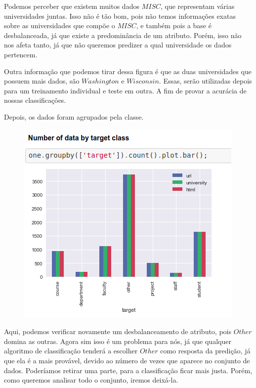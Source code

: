 \documentclass [12pt, a4paper] {article}
\begin{document}
Podemos perceber que existem muitos dados $MISC$, que representam várias universidades juntas. Isso não é tão bom, pois não temos informações exatas sobre as universidades que compõe o $MISC$, e também pois a base é desbalanceada, já que existe a predominância de um atributo. Porém, isso não nos afeta tanto, já que não queremos predizer a qual universidade os dados pertencem.

Outra informação que podemos tirar dessa figura é que as duas universidades que possuem mais dados, são $Washington$ e $Wisconsin$. Essas, serão utilizadas depois para um treinamento individual e teste em outra. A fim de provar a acurácia de nossas classificações.


Depois, os dados foram agrupados pela classe.

\begin{figure}[!hbt]
		\begin{center}
		\includegraphics[width=1\columnwidth]{figuras/target.png}
		\end{center}
\end{figure}

Aqui, podemos verificar novamente um desbalanceamento de atributo, pois $Other$ domina as outras. Agora sim isso é um problema para nós, já que qualquer algoritmo de classificação tenderá a escolher $Other$ como resposta da predição, já que ela é a mais provável, devido ao número de vezes que aparece no conjunto de dados. Poderíamos retirar uma parte, para a classificação ficar mais justa. Porém, como queremos analisar todo o conjunto, iremos deixá-la.
\end{document}
